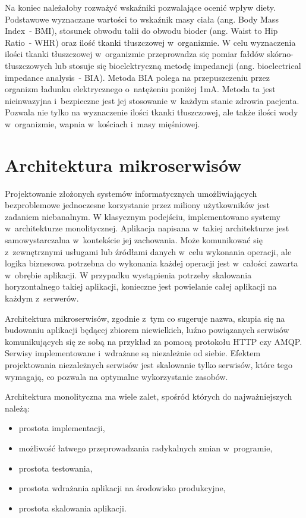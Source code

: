 \par
Na koniec należałoby rozważyć wskaźniki pozwalające ocenić wpływ diety.
Podstawowe wyznaczane wartości to wskaźnik masy ciała (ang. Body Mass Index~- BMI), stosunek obwodu talii do obwodu bioder (ang. Waist to Hip Ratio~- WHR) oraz ilość tkanki tłuszczowej w~organizmie.
W celu wyznaczenia ilości tkanki tłuszczowej w~organizmie przeprowadza się pomiar fałdów skórno-tłuszczowych lub stosuje się bioelektryczną metodę impedancji (ang. bioelectrical impedance analysis~- BIA).
Metoda BIA polega na przepuszczeniu przez organizm ładunku elektrycznego o~natężeniu poniżej 1mA.
Metoda ta jest nieinwazyjna i~bezpieczne jest jej stosowanie w~każdym stanie zdrowia pacjenta.
Pozwala nie tylko na wyznaczenie ilości tkanki tłuszczowej, ale także ilości wody w~organizmie, wapnia w~kościach i~masy mięśniowej\cite{book:dietetyka-zywienie-zdrowego-i-chorego-czlowieka}.

\section{Architektura mikroserwisów}\label{sec:usefull-technologies}

Projektowanie złożonych systemów informatycznych umożliwiających bezproblemowe jednoczesne korzystanie przez miliony użytkowników jest zadaniem niebanalnym.
W klasycznym podejściu, implementowano systemy w~architekturze monolitycznej.
Aplikacja napisana w~takiej architekturze jest samowystarczalna w~kontekście jej zachowania.
Może komunikować się z~zewnętrznymi usługami lub źródłami danych w~celu wykonania operacji,
ale logika biznesowa potrzebna do wykonania każdej operacji jest w~całości zawarta w~obrębie aplikacji.
W przypadku wystąpienia potrzeby skalowania horyzontalnego takiej aplikacji,
konieczne jest powielanie całej aplikacji na każdym z~serwerów\cite{url:microsoft-web-architectures}.

\par
Architektura mikroserwisów, zgodnie z~tym co sugeruje nazwa, skupia się na budowaniu aplikacji będącej zbiorem niewielkich,
luźno powiązanych serwisów komunikujących się ze sobą na przykład za pomocą protokołu HTTP czy AMQP.
Serwisy implementowane i~wdrażane są niezależnie od siebie\cite{book:dot-net-microservices}.
Efektem projektowania niezależnych serwisów jest skalowanie tylko serwisów, które tego wymagają,
co pozwala na optymalne wykorzystanie zasobów\cite{book:mastering-microservices-with-java9}.

\par
Architektura monolityczna ma wiele zalet\cite{book:microservices-patterns}, spośród których do najważniejszych należą:
\begin{itemize}
    \item prostota implementacji,
    \item możliwość łatwego przeprowadzania radykalnych zmian w~programie,
    \item prostota testowania,
    \item prostota wdrażania aplikacji na środowisko produkcyjne,
    \item prostota skalowania aplikacji.
\end{itemize}

